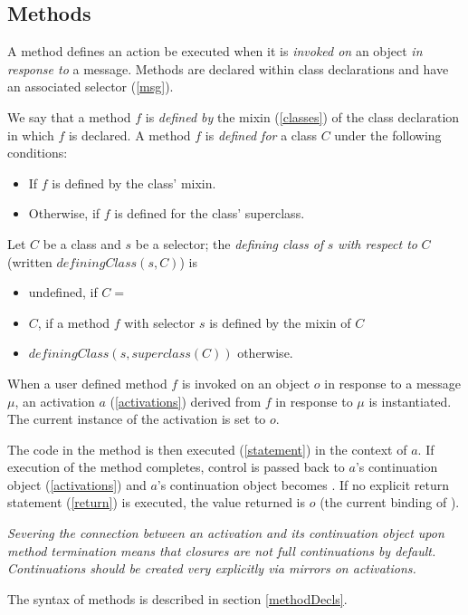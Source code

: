 \documentclass{article}
\begin{document}
\subsection{Methods}
\label{mtds}

A method defines an action be executed when it is {\em invoked on} an object {\em in response to} a message.
Methods are declared within class declarations and have an associated selector (\ref{msg}). 

We say that a method $f$ is {\em defined by} the mixin (\ref{classes}) of the class declaration in which $f$ is declared. A method $f$ is {\em defined for} a class $C$ under the following conditions:
\begin{itemize}
\item If $f$ is defined by the class' mixin.
\item Otherwise, if $f$ is defined for the class' superclass.
\end{itemize}

Let $C$ be a class and $s$ be a selector; the {\em defining class of} $s$ {\em with respect to} $C$ (written $definingClass(s, C)$)  is
\begin{itemize}
\item undefined, if $C =$ 
\item $C$,  if a method $f$ with selector $s$ is defined by the mixin of $C$
\item	$definingClass(s, superclass(C))$ otherwise.
\end{itemize}

When a user defined method $f$ is invoked on an object $o$ in response to a message $\mu$, an activation $a$ (\ref{activations}) derived from $f$ in response to $\mu$ is instantiated. The current instance of the activation is set to $o$. 

The code in the method is then executed (\ref{statement}) in the context of $a$.  If execution of the method completes, control is passed back to $a$'s continuation object (\ref{activations}) and $a$'s continuation object becomes \NIL{}. If no explicit return statement (\ref{return}) is executed, the value returned is $o$ (the current binding of \SELF{}).

{\it
Severing the connection between an activation and its continuation object upon method termination means that closures are not full continuations by default. Continuations should be created very explicitly via mirrors on activations.
}

The syntax of methods is described in section \ref{methodDecls}.
\end{document}
